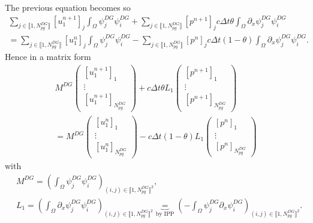 \documentclass[a4paper, 11pt]{report}
\begin{document}
The previous equation becomes so
\begin{multline*}
\sum_{j\in\llbracket1,N_{pg}^{DG}\rrbracket}\left[u_1^{n+1}\right]_j\int_{\Omega}\psi^{DG}_j\psi^{DG}_i+\sum_{j\in\llbracket1,N_{pg}^{DG}\rrbracket}\left[p^{n+1}\right]_jc\Delta t\theta\int_{\Omega}\partial_x\psi^{DG}_j\psi^{DG}_i\\=\sum_{j\in\llbracket1,N_{pg}^{DG}\rrbracket}\left[u^n_1\right]_j\int_{\Omega}\psi^{DG}_j\psi^{DG}_i-\sum_{j\in\llbracket1,N_{pg}^{DG}\rrbracket}\left[p^{n}\right]_jc\Delta t(1-\theta)\int_{\Omega}\partial_x\psi^{DG}_j\psi^{DG}_i.
\end{multline*}
Hence in a matrix form
\begin{multline*}
M^{DG}\begin{pmatrix}\left[u_1^{n+1}\right]_1\\ \vdots \\ \left[u_1^{n+1}\right]_{N_{pg}^{DG}}\end{pmatrix}+c\Delta t \theta L_1 \begin{pmatrix}\left[p^{n+1}\right]_1\\ \vdots \\ \left[p^{n+1}\right]_{N_{pg}^{DG}}\end{pmatrix}\\=M^{DG}\begin{pmatrix}\left[u_1^{n}\right]_1\\ \vdots \\ \left[u_1^{n}\right]_{N_{pg}^{DG}}\end{pmatrix}-c\Delta t (1-\theta) L_1 \begin{pmatrix}\left[p^{n}\right]_1\\ \vdots \\ \left[p^{n}\right]_{N_{pg}^{DG}}\end{pmatrix}
\end{multline*}
with
\begin{equation*}
\begin{split}
&M^{DG}=\left(\int_{\Omega}\psi^{DG}_j\psi^{DG}_i\right)_{(i,j)\in\llbracket1,N_{pg}^{DG}\rrbracket^2},\\
&L_1=\left(\int_{\Omega}\partial_x \psi^{DG}_j\psi^{DG}_i\right)_{{(i,j)\in\llbracket1,N_{pg}^{DG}\rrbracket^2}}\underbrace{=}_{\text{by IPP}}\left(-\int_{\Omega} \psi^{DG}_j\partial_x\psi^{DG}_i\right)_{{(i,j)\in\llbracket1,N_{pg}^{DG}\rrbracket^2}}.
\end{split}
\end{equation*}
\end{document}
